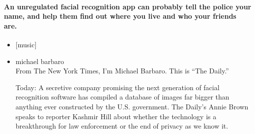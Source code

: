 \hypertarget{an-unregulated-facial-recognition-app-can-probably-tell-the-police-your-name-and-help-them-find-out-where-you-live-and-who-your-friends-are}{%
\paragraph{An unregulated facial recognition app can probably tell the
police your name, and help them find out where you live and who your
friends
are.}\label{an-unregulated-facial-recognition-app-can-probably-tell-the-police-your-name-and-help-them-find-out-where-you-live-and-who-your-friends-are}}

\begin{itemize}
\item
  {[}music{]}
\item
  michael barbaro\\
  From The New York Times, I'm Michael Barbaro. This is ``The Daily.''

  Today: A secretive company promising the next generation of facial
  recognition software has compiled a database of images far bigger than
  anything ever constructed by the U.S. government. The Daily's Annie
  Brown speaks to reporter Kashmir Hill about whether the technology is
  a breakthrough for law enforcement or the end of privacy as we know
  it.


\end{itemize}
